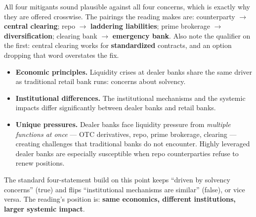 \begin{lrtrapbox}
All four mitigants sound plausible against all four concerns, which is exactly why they are offered crosswise. The pairings the reading makes are: counterparty $\rightarrow$ \textbf{central clearing}; repo $\rightarrow$ \textbf{laddering liabilities}; prime brokerage $\rightarrow$ \textbf{diversification}; clearing bank $\rightarrow$ \textbf{emergency bank}. Also note the qualifier on the first: central clearing works for \textbf{standardized} contracts, and an option dropping that word overstates the fix.
\end{lrtrapbox}

\begin{lrkeybox}
\begin{itemize}
\item \textbf{Economic principles.} Liquidity crises at dealer banks share the same driver as traditional retail bank runs: concerns about solvency.
\item \textbf{Institutional differences.} The institutional mechanisms and the systemic impacts differ significantly between dealer banks and retail banks.
\item \textbf{Unique pressures.} Dealer banks face liquidity pressure from \emph{multiple functions at once} --- OTC derivatives, repo, prime brokerage, clearing --- creating challenges that traditional banks do not encounter. Highly leveraged dealer banks are especially susceptible when repo counterparties refuse to renew positions.
\end{itemize}
\end{lrkeybox}

\begin{lrtrapbox}
The standard four-statement build on this point keeps ``driven by solvency concerns'' (true) and flips ``institutional mechanisms are similar'' (false), or vice versa. The reading's position is: \textbf{same economics, different institutions, larger systemic impact}.
\end{lrtrapbox}


